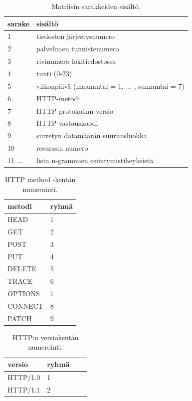 \begin{table}[p]
\centering
\begin{tabular}{l|l}
sarake & sisältö \\
\hline

1 & tiedoston järjestysnumero \\
2 & palvelimen tunnistenumero \\
3 & rivinumero lokitiedostossa \\
4 & tunti (0-23) \\
5 & viikonpäivä (maanantai = 1, ... , sunnuntai = 7) \\
6 & HTTP-metodi \\
7 & HTTP-protokollan versio \\
8 & HTTP-vastauskoodi \\
9 & siirretyn datamäärän suuruusluokka \\
10 & resurssin numero \\
11 ... & lista n-grammien esiintymistiheyksistä \\

\end{tabular}
\caption{Matriisin sarakkeiden sisältö.}
\label{matriisi}
\end{table}

\begin{table}[p]
\centering
\begin{tabular}{ll}
metodi & ryhmä \\
\hline
HEAD & 1 \\
GET & 2 \\
POST & 3 \\
PUT & 4 \\
DELETE & 5 \\
TRACE & 6 \\
OPTIONS & 7 \\
CONNECT & 8 \\
PATCH & 9 \\

\end{tabular}
\caption{HTTP method -kentän numerointi.}
\label{metodi}
\end{table}

\begin{table}[p]
\centering
\begin{tabular}{llll}
versio & ryhmä \\
\hline
HTTP/1.0 & 1 \\
HTTP/1.1 & 2 \\
\end{tabular}
\caption{ HTTP:n versiokentän numerointi.}
\label{httpversio}
\end{table}

